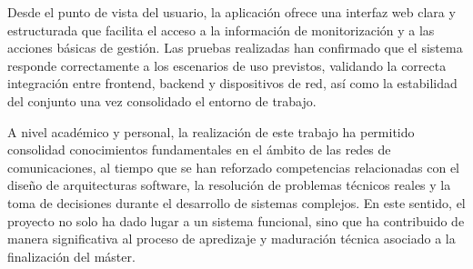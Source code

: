 Desde el punto de vista del usuario, la aplicación ofrece una interfaz web clara y estructurada que facilita el acceso a la información de monitorización y a las acciones básicas de gestión. Las pruebas realizadas han confirmado que el sistema responde correctamente a los escenarios de uso previstos, validando la correcta integración entre frontend, backend y dispositivos de red, así como la estabilidad del conjunto una vez consolidado el entorno de trabajo.

A nivel académico y personal, la realización de este trabajo ha permitido consolidad conocimientos fundamentales en el ámbito de las redes de comunicaciones, al tiempo que se han reforzado competencias relacionadas con el diseño de arquitecturas software, la resolución de problemas técnicos reales y la toma de decisiones durante el desarrollo de sistemas complejos. En este sentido, el proyecto no solo ha dado lugar a un sistema funcional, sino que ha contribuido de manera significativa al proceso de apredizaje y maduración técnica asociado a la finalización del máster.



